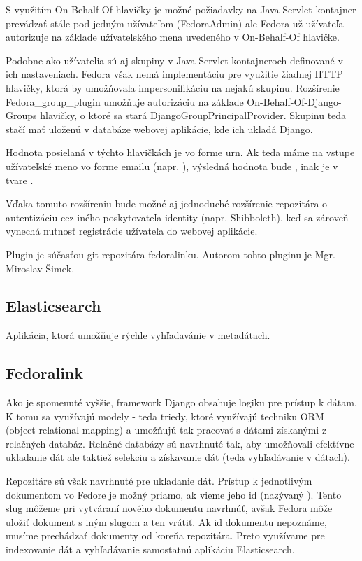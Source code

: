 \documentclass[thesis=M,slovak]{FITthesis}[2013/05/06]
\begin{document}
S využitím On-Behalf-Of hlavičky je možné požiadavky na Java Servlet kontajner prevádzať stále pod jedným užívateľom (FedoraAdmin) ale Fedora už užívateľa autorizuje na základe užívateľského mena uvedeného v On-Behalf-Of hlavičke.

Podobne ako užívatelia sú aj skupiny v Java Servlet kontajneroch definované v ich nastaveniach. Fedora však nemá implementáciu pre využitie žiadnej HTTP hlavičky, ktorá by umožňovala impersonifikáciu na nejakú skupinu. Rozšírenie Fedora\_group\_plugin umožňuje autorizáciu na základe On-Behalf-Of-Django-Groups hlavičky, o ktoré sa stará DjangoGroupPrincipalProvider. Skupinu teda stačí mať uloženú v databáze webovej aplikácie, kde ich ukladá Django.

Hodnota posielaná v týchto hlavičkách je vo forme urn.
Ak teda máme na vstupe užívateľské meno vo forme emailu (napr. ), výsledná hodnota bude , inak je v tvare . 

Vďaka tomuto rozšíreniu bude možné aj jednoduché rozšírenie repozitára o autentizáciu cez iného poskytovateľa identity (napr. Shibboleth), keď sa zároveň vynechá nutnosť registrácie užívateľa do webovej aplikácie.

Plugin je súčasťou git repozitára fedoralinku. Autorom tohto pluginu je Mgr. Miroslav Šimek. 

\subsection{Elasticsearch}
Aplikácia, ktorá umožňuje rýchle vyhľadavánie v metadátach.

\subsection{Fedoralink}
Ako je spomenuté vyššie, framework Django obsahuje logiku pre prístup k dátam. K tomu sa využívajú modely - teda triedy, ktoré využívajú techniku ORM (object-relational mapping) a umožňujú tak pracovať s dátami získanými z relačných databáz. Relačné databázy sú navrhnuté tak, aby umožňovali efektívne ukladanie dát ale taktiež selekciu a získavanie dát (teda vyhľadávanie v dátach).

Repozitáre sú však navrhnuté pre ukladanie dát. Prístup k jednotlivým dokumentom vo Fedore je možný priamo, ak vieme jeho id (nazývaný ). Tento slug môžeme pri vytváraní nového dokumentu navrhnúť, avšak Fedora môže uložiť dokument s iným slugom a ten vrátiť. Ak id dokumentu nepoznáme, musíme prechádzať dokumenty od koreňa repozitára. Preto využívame pre indexovanie dát a vyhľadávanie samostatnú aplikáciu Elasticsearch.
\end{document}
